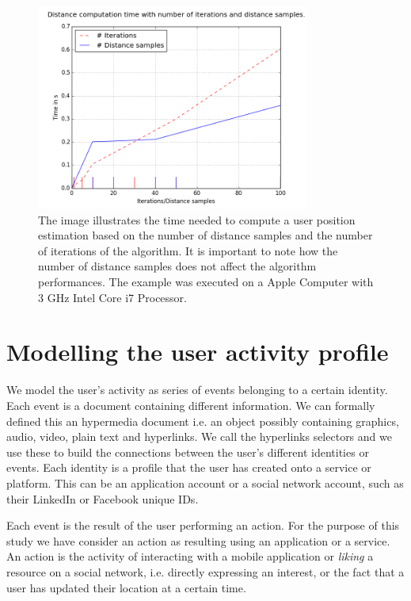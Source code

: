 \begin{figure}[t]
\centering
\includegraphics[width=90mm]{figures/figure_time.png}
\caption[Computational time needed to estimate a user position.]{The image illustrates the time needed to compute a user position estimation based on the number of distance samples and the number of iterations of the algorithm. It is important to note how the number of distance samples does not affect the algorithm performances. The example was executed on a Apple Computer with 3 GHz Intel Core i7 Processor.
\label{fig:comp_time}}
\end{figure}

\section{Modelling the user activity profile}
\label{sec:activity-profile}

We model the user's activity as series of events belonging to a certain identity. Each event is a document containing different information. We can formally defined this an hypermedia document i.e. an object possibly containing graphics, audio, video, plain text and hyperlinks. We call the hyperlinks selectors and we use these to build the connections between the user's different identities or events. Each identity is a profile that the user has created onto a service or platform. This can be an application account or a social network account, such as their LinkedIn or Facebook unique IDs.

Each event is the result of the user performing an action. For the purpose of this study we have consider an action as resulting using an application or a service. An action is the activity of interacting with a mobile application or \emph{liking} a resource on a social network, i.e. directly expressing an interest, or the fact that a user has updated their location at a certain time.

